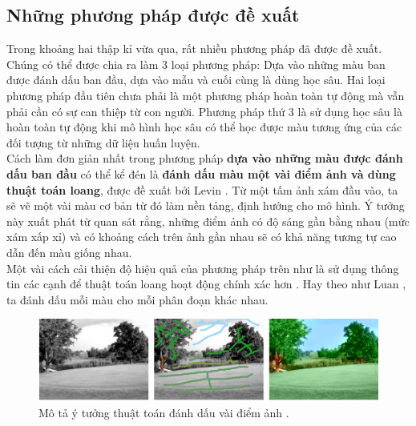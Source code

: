 \documentclass[a4paper, 12pt]{article}
\begin{document}
\subsection{Những phương pháp được đề xuất}
Trong khoảng hai thập kỉ vừa qua, rất nhiều phương pháp đã được đề xuất. Chúng có thể được chia ra làm 3 loại phương pháp: Dựa vào những màu ban được đánh dấu ban đầu, dựa vào mẫu và cuối cùng là dùng học sâu. Hai loại phương pháp đầu tiên chưa phải là một phương pháp hoàn toàn tự động mà vẫn phải cần có sự can thiệp từ con người. Phương pháp thứ 3 là sử dụng học sâu là hoàn toàn tự động khi mô hình học sâu có thể học được màu tương ứng của các đối tượng từ những dữ liệu huấn luyện.\vspace{5pt}\\
Cách làm đơn giản nhất trong phương pháp \textbf{dựa vào những màu được đánh dấu ban đầu} có thể kể đén là \textbf{đánh dấu màu một vài điểm ảnh và dùng thuật toán loang}, được đề xuất bởi Levin \cite{alevincolorization}. Từ một tấm ảnh xám đầu vào, ta sẽ vẽ một vài màu cơ bản từ đó làm nền tảng, định hướng cho mô hình. Ý tưởng này xuất phát từ quan sát rằng, những điểm ảnh có độ sáng gần bằng nhau (mức xám xấp xỉ) và có khoảng cách trên ảnh gần nhau sẽ có khả năng tương tự cao dẫn đến màu giống nhau.\\
Một vài cách cải thiện độ hiệu quả của phương pháp trên như là sử dụng thông tin các cạnh để thuật toán loang hoạt động chính xác hơn \cite{huangcolorization}. Hay theo như Luan \cite{luancolorization}, ta đánh dấu mỗi màu cho mỗi phân đoạn khác nhau. 

\begin{figure}[!h]
\captionsetup{width=0.8\textwidth}
\centering
\includegraphics[width=15cm]{images/2_4.png}
\caption{Mô tả ý tưởng thuật toán đánh dấu vài điểm ảnh \cite{trungcolorization2018}.}
\label{fig:scribblemethod}
\end{figure}
\end{document}
